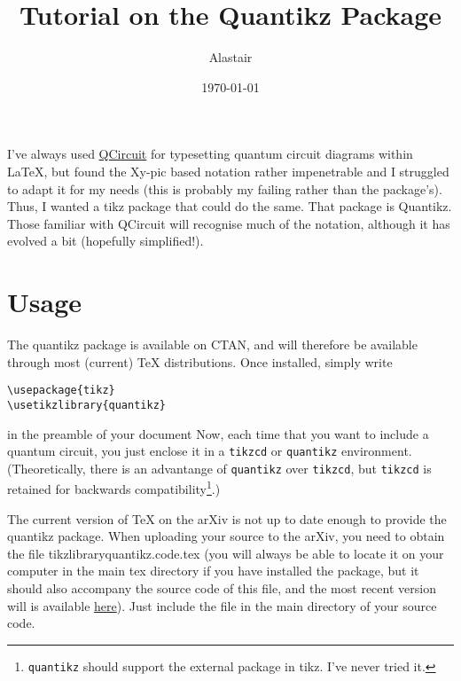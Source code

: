 \documentclass[aps,pra,10pt,nofootinbib]{revtex4}
\begin{document}
\title{Tutorial on the Quantikz Package}
\date{\today}
\author{Alastair }
\begin{abstract}
\end{abstract}
\maketitle
I've always used \href{https://arxiv.org/abs/quant-ph/0406003}{QCircuit} for typesetting quantum circuit diagrams within \LaTeX, but found the Xy-pic based notation rather impenetrable and I struggled to adapt it for my needs (this is probably my failing rather than the package's). Thus, I wanted a tikz package that could do the same. That package is Quantikz. Those familiar with QCircuit will recognise much of the notation, although it has evolved a bit (hopefully simplified!).

\section{Usage}

The quantikz package is available on CTAN, and will therefore be available through most (current) TeX distributions. Once installed, simply write
\begin{verbatim}
\usepackage{tikz}
\usetikzlibrary{quantikz}
\end{verbatim}
in the preamble of your document
Now, each time that you want to include a quantum circuit, you just enclose it in a \verb!tikzcd! or \verb!quantikz! environment. (Theoretically, there is an advantange of \verb!quantikz! over \verb!tikzcd!, but \verb!tikzcd! is retained for backwards compatibility\footnote{\texttt{quantikz} should support the external package in tikz. I've never tried it.}.)

The current version of TeX on the arXiv is not up to date enough to provide the quantikz package. When uploading your source to the arXiv, you need to obtain the file tikzlibraryquantikz.code.tex (you will always be able to locate it on your computer in the main tex directory if you have installed the package, but it should also accompany the source code of this file, and the most recent version will is available \href{http://dx.doi.org/10.17637/rh.7000520}{here}). Just include the file in the main directory of your source code.
\end{document}
